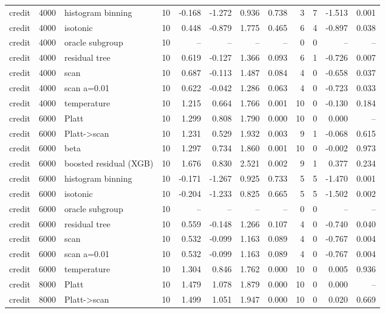 \begin{tabular}{lllrrrrrrrrr}
credit & 4000 & histogram binning & 10 & -0.168 & -1.272 & 0.936 & 0.738 & 3 & 7 & -1.513 & 0.001 \\
credit & 4000 & isotonic & 10 & 0.448 & -0.879 & 1.775 & 0.465 & 6 & 4 & -0.897 & 0.038 \\
credit & 4000 & oracle subgroup & 10 & -- & -- & -- & -- & 0 & 0 & -- & -- \\
credit & 4000 & residual tree & 10 & 0.619 & -0.127 & 1.366 & 0.093 & 6 & 1 & -0.726 & 0.007 \\
credit & 4000 & scan & 10 & 0.687 & -0.113 & 1.487 & 0.084 & 4 & 0 & -0.658 & 0.037 \\
credit & 4000 & scan a=0.01 & 10 & 0.622 & -0.042 & 1.286 & 0.063 & 4 & 0 & -0.723 & 0.033 \\
credit & 4000 & temperature & 10 & 1.215 & 0.664 & 1.766 & 0.001 & 10 & 0 & -0.130 & 0.184 \\
credit & 6000 & Platt & 10 & 1.299 & 0.808 & 1.790 & 0.000 & 10 & 0 & 0.000 & -- \\
credit & 6000 & Platt->scan & 10 & 1.231 & 0.529 & 1.932 & 0.003 & 9 & 1 & -0.068 & 0.615 \\
credit & 6000 & beta & 10 & 1.297 & 0.734 & 1.860 & 0.001 & 10 & 0 & -0.002 & 0.973 \\
credit & 6000 & boosted residual (XGB) & 10 & 1.676 & 0.830 & 2.521 & 0.002 & 9 & 1 & 0.377 & 0.234 \\
credit & 6000 & histogram binning & 10 & -0.171 & -1.267 & 0.925 & 0.733 & 5 & 5 & -1.470 & 0.001 \\
credit & 6000 & isotonic & 10 & -0.204 & -1.233 & 0.825 & 0.665 & 5 & 5 & -1.502 & 0.002 \\
credit & 6000 & oracle subgroup & 10 & -- & -- & -- & -- & 0 & 0 & -- & -- \\
credit & 6000 & residual tree & 10 & 0.559 & -0.148 & 1.266 & 0.107 & 4 & 0 & -0.740 & 0.040 \\
credit & 6000 & scan & 10 & 0.532 & -0.099 & 1.163 & 0.089 & 4 & 0 & -0.767 & 0.004 \\
credit & 6000 & scan a=0.01 & 10 & 0.532 & -0.099 & 1.163 & 0.089 & 4 & 0 & -0.767 & 0.004 \\
credit & 6000 & temperature & 10 & 1.304 & 0.846 & 1.762 & 0.000 & 10 & 0 & 0.005 & 0.936 \\
credit & 8000 & Platt & 10 & 1.479 & 1.078 & 1.879 & 0.000 & 10 & 0 & 0.000 & -- \\
credit & 8000 & Platt->scan & 10 & 1.499 & 1.051 & 1.947 & 0.000 & 10 & 0 & 0.020 & 0.669 \\

\end{tabular}
